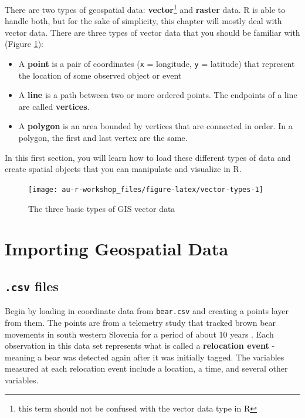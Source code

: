 \documentclass[]{book}
\providecommand{\tightlist}{%
  \setlength{\itemsep}{0pt}\setlength{\parskip}{0pt}}
\let\rmarkdownfootnote\footnote%
\def\footnote{\protect\rmarkdownfootnote}
\begin{document}
There are two types of geospatial data: \textbf{vector}\footnote{this term should not be confused with the vector data type in R} and \textbf{raster} data. R is able to handle both, but for the sake of simplicity, this chapter will mostly deal with vector data. There are three types of vector data that you should be familiar with (Figure \ref{fig:vector-types}):

\begin{itemize}
\tightlist
\item
  A \textbf{point} is a pair of coordinates (\texttt{x} = longitude, \texttt{y} = latitude) that represent the location of some observed object or event
\item
  A \textbf{line} is a path between two or more ordered points. The endpoints of a line are called \textbf{vertices}.
\item
  A \textbf{polygon} is an area bounded by vertices that are connected in order. In a polygon, the first and last vertex are the same.
\end{itemize}

In this first section, you will learn how to load these different types of data and create spatial objects that you can manipulate and visualize in R.

\begin{figure}

{\centering \texttt{[image: au-r-workshop\_files/figure-latex/vector-types-1]} 

}

\caption{The three basic types of GIS vector data}\label{fig:vector-types}
\end{figure}

\hypertarget{Import}{%
\section{Importing Geospatial Data}\label{Import}}

\hypertarget{csv-files-1}{%
\subsection{\texorpdfstring{\texttt{.csv} files}{.csv files}}\label{csv-files-1}}

Begin by loading in coordinate data from \texttt{bear.csv} and creating a points layer from them. The points are from a telemetry study that tracked brown bear movements in south western Slovenia for a period of about 10 years \citep{bears-cite}. Each observation in this data set represents what is called a \textbf{relocation event} - meaning a bear was detected again after it was initially tagged. The variables measured at each relocation event include a location, a time, and several other variables.
\end{document}
